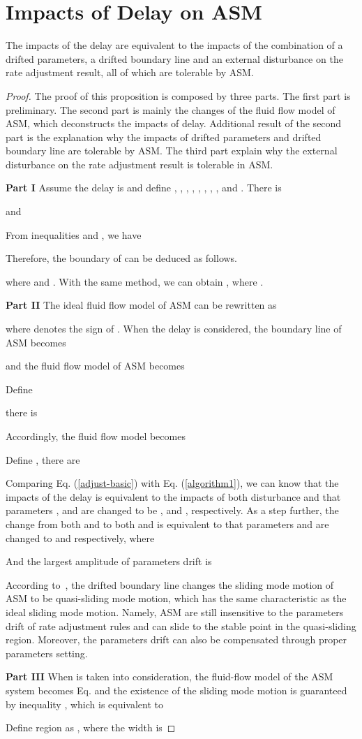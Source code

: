 \documentclass{sig-alternate-10pt}
\begin{document}
\section{Impacts of Delay on ASM}
\begin{theorem}
The impacts of the delay are equivalent to the impacts of the combination of a drifted parameters, a drifted boundary line  and an external disturbance  on the rate adjustment result, all of which are tolerable by ASM.
\label{Proposition2}
\end{theorem}
\begin{proof}
The proof of this proposition is composed by three parts. The first part is preliminary. The second part is mainly the changes of the fluid flow model of ASM, which deconstructs the impacts of delay. Additional result of the second part is the explanation why the impacts of drifted parameters and drifted boundary line are tolerable by ASM. The third part explain why the external disturbance  on the rate adjustment result is tolerable in ASM.

\textbf{Part I}
Assume the delay is  and define , , , , , , , ,  and . There is

and

From inequalities  and , we have

Therefore, the boundary of  can be deduced as follows.

where  and . With the same method, we can obtain , where .

\textbf{Part II}
The ideal fluid flow model of ASM  can be rewritten as

where  denotes the sign of . When the delay  is considered, the boundary line of ASM becomes

and the fluid flow model of ASM becomes

Define

there is

Accordingly, the fluid flow model  becomes

Define , there are

Comparing Eq. (\ref{adjust-basic}) with Eq. (\ref{algorithm1}), we can know that the impacts of the delay is equivalent to the impacts of both disturbance  and that parameters ,  and  are changed to be ,  and , respectively. As a step further, the change from both  and  to both  and  is equivalent to that parameters  and  are changed to  and  respectively, where

And the largest amplitude of parameters drift is 

According to~\cite{Itkis}, the drifted boundary line changes the sliding mode motion of ASM to be quasi-sliding mode motion, which has the same characteristic as the ideal sliding mode motion. Namely, ASM are still insensitive to the parameters drift of rate adjustment rules and can slide to the stable point in the quasi-sliding region. Moreover, the parameters drift can also be compensated through proper parameters setting.


\textbf{Part III}
When  is taken into consideration, the fluid-flow model of the ASM system becomes Eq.  and the existence of the sliding mode motion is guaranteed by inequality , which is equivalent to

Define region  as , where the width  is  

\end{proof}
\end{document}
